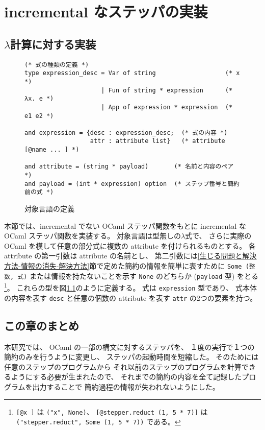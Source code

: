 \chapter{incremental なステッパの実装}
\label{chapter:incremental}







\section{$\lambda$計算に対する実装}

\begin{figure}
\begin{spacing}{0.8}
\begin{verbatim}
(* 式の種類の定義 *)
type expression_desc = Var of string                   (* x *)
                     | Fun of string * expression      (* λx. e *)
                     | App of expression * expression  (* e1 e2 *)
                              
and expression = {desc : expression_desc;  (* 式の内容 *)
                  attr : attribute list}   (* attribute [@name ... ] *)

and attribute = (string * payload)       (* 名前と内容のペア *)
and payload = (int * expression) option  (* ステップ番号と簡約前の式 *)
\end{verbatim}
\end{spacing}
\caption{対象言語の定義}
\label{figure:lambda_with_attrributes}
\end{figure}

本節では、incremental でない OCaml ステッパ関数をもとに incremental なOCaml ステッパ関数を実装する。
対象言語は型無しの$\lambda$式で、
さらに実際の OCaml を模して任意の部分式に複数の attribute を付けられるものとする。
各 attribute の第一引数は attribute の名前とし、
第二引数には\ref{生じる問題と解決方法-情報の消失-解決方法}節で定めた簡約の情報を簡単に表すために
\texttt{Some (整数, 式)} または情報を持たないことを示す \texttt{None} のどちらか
(\texttt{payload} 型)
をとる\footnote{\texttt{[@x ]} は \texttt{("x", None)}、
\texttt{[@stepper.reduct (1, 5 * 7)]} は
\texttt{("stepper.reduct", Some (1, 5 * 7))} である。}。
これらの型を図\ref{figure:lambda_with_attrributes}のように定義する。
式は \texttt{expression} 型であり、
式本体の内容を表す \texttt{desc} と任意の個数の attribute を表す \texttt{attr} の2つの要素を持つ。











\section{この章のまとめ}

本研究では、
OCaml の一部の構文に対するステッパを、
１度の実行で１つの簡約のみを行うように変更し、
ステッパの起動時間を短縮した。
そのためには任意のステップのプログラムから
それ以前のステップのプログラムを計算できるようにする必要が生まれたので、
それまでの簡約の内容を全て記録したプログラムを出力することで
簡約過程の情報が失われないようにした。
